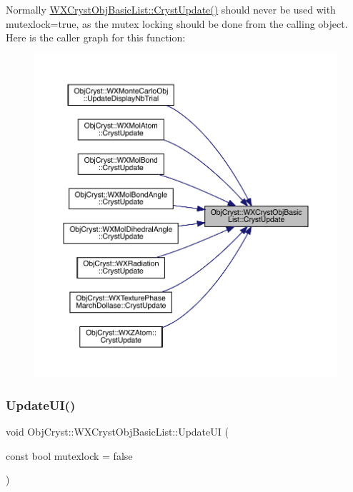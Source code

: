 Normally \mbox{\hyperlink{class_obj_cryst_1_1_w_x_cryst_obj_basic_list_a96cbd9c8341467f21a38964c2838a9c2}{W\+X\+Cryst\+Obj\+Basic\+List\+::\+Cryst\+Update()}} should never be used with mutexlock=true, as the mutex locking should be done from the calling object. Here is the caller graph for this function\+:
\nopagebreak
\begin{figure}[H]
\begin{center}
\leavevmode
\includegraphics[width=350pt]{class_obj_cryst_1_1_w_x_cryst_obj_basic_list_a96cbd9c8341467f21a38964c2838a9c2_icgraph}
\end{center}
\end{figure}
\mbox{\label{class_obj_cryst_1_1_w_x_cryst_obj_basic_list_a64a74ecbcfb7a7066e73f0ffdfad2a98}} 
\subsubsection{\texorpdfstring{UpdateUI()}{UpdateUI()}}
{\footnotesize\ttfamily void Obj\+Cryst\+::\+W\+X\+Cryst\+Obj\+Basic\+List\+::\+Update\+UI (\begin{DoxyParamCaption}\item[{const bool}]{mutexlock = {\ttfamily false} }\end{DoxyParamCaption})}

